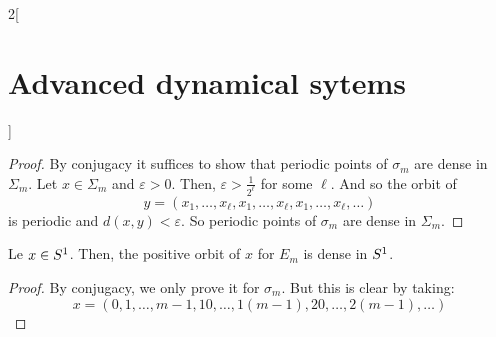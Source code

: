\documentclass[../../../main_math.tex]{subfiles}
\begin{document}
\begin{multicols}{2}[\section{Advanced dynamical sytems}]
  \begin{proof}
    By conjugacy it suffices to show that periodic points of $\sigma_m$ are dense in $\Sigma_m$. Let $x\in \Sigma_m$ and $\varepsilon>0$. Then, $\varepsilon>\frac{1}{2^\ell}$ for some $\ell$. And so the orbit of
    $$
      y=(x_1,\ldots,x_\ell,x_1,\ldots,x_\ell,x_1,\ldots,x_\ell,\ldots)
    $$
    is periodic and $d(x,y)<\varepsilon$. So periodic points of $\sigma_m$ are dense in $\Sigma_m$.
  \end{proof}
  \begin{proposition}
    Le $x\in \S^1$. Then, the positive orbit of $x$ for $E_m$ is dense in $\S^1$.
  \end{proposition}
  \begin{proof}
    By conjugacy, we only prove it for $\sigma_m$. But this is clear by taking:
    $$
      x=(0,1,\ldots,m-1,10,\ldots,1(m-1),20,\ldots,2(m-1),\ldots)
    $$
  \end{proof}

\end{multicols}
\end{document}
